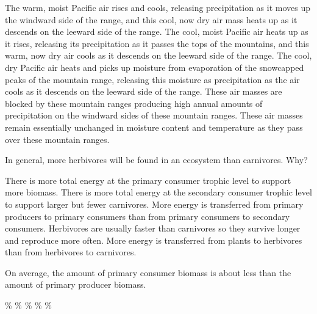 \begin{choices}
\correctchoice The warm, moist Pacific air rises and cools, releasing precipitation as it moves up the windward side of the range, and this cool, now dry air mass heats up as it descends on the leeward side of the range.  %
\choice The cool, moist Pacific air heats up as it rises, releasing its precipitation as it passes the tops of the mountains, and this warm, now dry air cools as it descends on the leeward side of the range. %
\choice The cool, dry Pacific air heats and picks up moisture from evaporation of the snowcapped peaks of the mountain range, releasing this moisture as precipitation as the air cools as it descends on the leeward side of the range.  %
\choice These air masses are blocked by these mountain ranges producing high annual amounts of precipitation on the windward sides of these mountain ranges.  %
\choice These air masses remain essentially unchanged in moisture content and temperature as they pass over these mountain ranges.  %
\end{choices}





\question
In general, more herbivores will be found in an ecosystem than carnivores. Why?

\begin{choices}
\correctchoice There is more total energy at the primary consumer trophic level to support more biomass.%
\choice There is more total energy at the secondary consumer trophic level to support larger but fewer carnivores.%
\choice More energy is transferred from primary producers to primary consumers than from primary consumers to secondary consumers.%
\choice Herbivores are usually faster than carnivores so they survive longer and reproduce more often.%
\choice More energy is transferred from plants to herbivores than from herbivores to carnivores.%
\end{choices}


\question
On average, the amount of primary consumer biomass is about \underline{\hspace{2cm}} less than the amount of primary producer biomass.

\begin{choices}
\% %
\% %
\% %
\% %
\% %
\end{choices}


